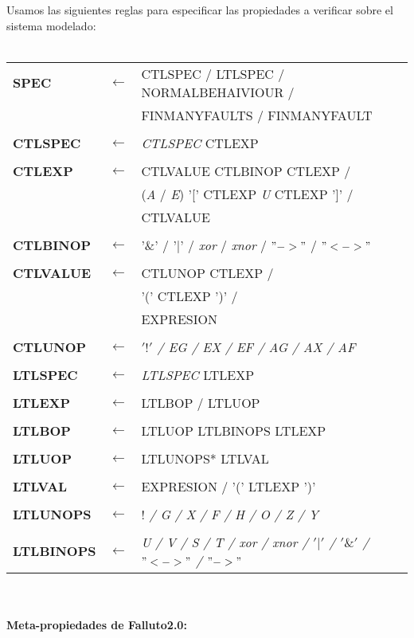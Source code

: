 \documentclass[titlepage, 12pt]{book}
\begin{document}
Usamos las siguientes reglas para especificar las propiedades a verificar sobre el sistema modelado:\\\\

\noindent\begin{tabular}{>{\bfseries}lll}
SPEC & $\longleftarrow$ & CTLSPEC / LTLSPEC / NORMALBEHAIVIOUR /\\
	 &	 			    & FINMANYFAULTS / FINMANYFAULT\\\\
CTLSPEC & $\longleftarrow$ &\textit{CTLSPEC} CTLEXP\\\\
CTLEXP & $\longleftarrow$ & CTLVALUE CTLBINOP CTLEXP /\\
         &               & (\textit{A} / \textit{E}) '[' CTLEXP \textit{U} CTLEXP ']' /\\
         &               & CTLVALUE\\\\
CTLBINOP & $\longleftarrow$ & '\&' / '$|$' / \textit{xor} / \textit{xnor} / $"->"$ / $"<->"$\\\\
CTLVALUE & $\longleftarrow$ & CTLUNOP CTLEXP /\\
         &                  & '(' CTLEXP ')' /\\
         &                  & EXPRESION\\\\
CTLUNOP & $\longleftarrow$ & \textit{$'!'$ / EG / EX / EF / AG / AX / AF}\\\\
LTLSPEC & $\longleftarrow$ & \textit{LTLSPEC} LTLEXP\\\\
LTLEXP & $\longleftarrow$ & LTLBOP / LTLUOP\\\\
LTLBOP & $\longleftarrow$ & LTLUOP LTLBINOPS LTLEXP\\\\
LTLUOP & $\longleftarrow$ & LTLUNOPS* LTLVAL\\\\
LTLVAL & $\longleftarrow$ & EXPRESION / '(' LTLEXP ')'\\\\
LTLUNOPS & $\longleftarrow$ & \textit{$!$ / G / X / F / H / O / Z / Y}\\\\
LTLBINOPS & $\longleftarrow$ & \textit{ U / V / S / T / xor / xnor / $'|'$ / $'\&'$ / $"<->"$ / $"->"$}\\
\end{tabular}
~\\\\
\newpage
\textbf{Meta-propiedades de Falluto2.0:}\\
\end{document}
